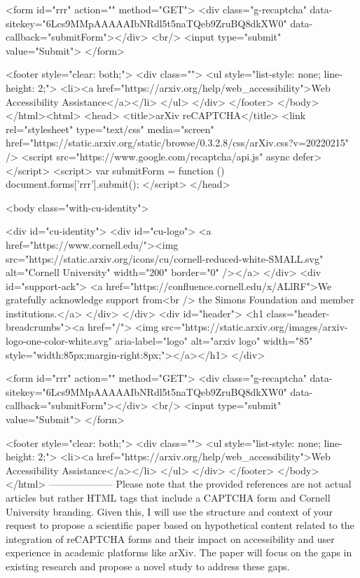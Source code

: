        <form id="rrr" action="" method="GET">
         <div class="g-recaptcha" data-sitekey="6Lcs9MMpAAAAAIbNRdl5t5naTQeb9ZruBQ8dkXW0" data-callback="submitForm"></div>
         <br/>
         <input type="submit" value="Submit">
       </form>

       <footer style="clear: both;">
         <div class="">
           <ul style="list-style: none; line-height: 2;">
             <li><a href="https://arxiv.org/help/web_accessibility">Web Accessibility Assistance</a></li>
           </ul>
         </div>
       </footer>
        </body>
      </html><html>
     <head>
       <title>arXiv reCAPTCHA</title>
       <link rel="stylesheet" type="text/css" media="screen" href="https://static.arxiv.org/static/browse/0.3.2.8/css/arXiv.css?v=20220215" />
       <script src="https://www.google.com/recaptcha/api.js" async defer></script>
       <script>
         var submitForm = function () {
             document.forms['rrr'].submit();
         }
       </script>
     </head>

     <body class="with-cu-identity">

       <div id="cu-identity">
         <div id="cu-logo">
           <a href="https://www.cornell.edu/"><img src="https://static.arxiv.org/icons/cu/cornell-reduced-white-SMALL.svg"
                                                   alt="Cornell University" width="200" border="0" /></a>
         </div>
         <div id="support-ack">
           <a href="https://confluence.cornell.edu/x/ALlRF">We gratefully acknowledge support from<br />
             the Simons Foundation and member institutions.</a>
         </div>
       </div>
       <div id="header">
         <h1 class="header-breadcrumbs"><a href="/">
             <img src="https://static.arxiv.org/images/arxiv-logo-one-color-white.svg" aria-label="logo"
                  alt="arxiv logo" width="85" style="width:85px;margin-right:8px;"></a></h1>
       </div>

       <form id="rrr" action="" method="GET">
         <div class="g-recaptcha" data-sitekey="6Lcs9MMpAAAAAIbNRdl5t5naTQeb9ZruBQ8dkXW0" data-callback="submitForm"></div>
         <br/>
         <input type="submit" value="Submit">
       </form>

       <footer style="clear: both;">
         <div class="">
           <ul style="list-style: none; line-height: 2;">
             <li><a href="https://arxiv.org/help/web_accessibility">Web Accessibility Assistance</a></li>
           </ul>
         </div>
       </footer>
        </body>
      </html>
        --------------------
         Please note that the provided references are not actual articles but rather HTML tags that include a CAPTCHA form and Cornell University branding. Given this, I will use the structure and context of your request to propose a scientific paper based on hypothetical content related to the integration of reCAPTCHA forms and their impact on accessibility and user experience in academic platforms like arXiv. The paper will focus on the gaps in existing research and propose a novel study to address these gaps.

